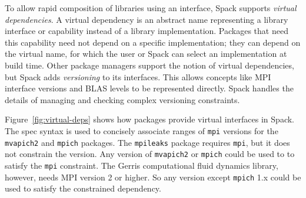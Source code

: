 To allow rapid composition of libraries using an interface, Spack supports
{\it virtual dependencies}.  A virtual dependency is an abstract name
representing a library interface or capability instead of a library
implementation.  Packages that need this capability need not depend on
a specific implementation; they can depend on the virtual name, for which
the user or Spack can select an implementation at build time.
Other package managers support the notion of virtual dependencies, but Spack
adds {\it versioning} to its interfaces.  This allows concepts like MPI
interface versions and BLAS levels to be represented directly.  Spack
handles the details of managing and checking complex versioning constraints.

Figure~\ref{fig:virtual-deps} shows how packages provide
virtual interfaces in Spack.  The spec syntax is used to concisely
associate ranges of {\tt mpi} versions for the {\tt mvapich2} and {\tt mpich} packages.
The {\tt mpileaks} package requires {\tt mpi}, but it does not constrain the version.
Any version of {\tt mvapich2} or {\tt mpich} could be used to to satisfy the {\tt mpi}
constraint. The Gerris computational fluid dynamics library, however, needs MPI version 2 or higher.  So any
version except {\tt mpich} 1.x could be used to satisfy the constrained dependency.


